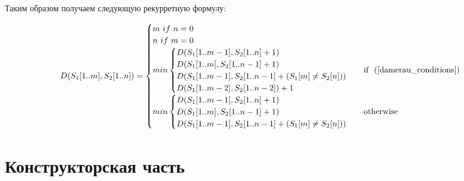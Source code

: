 \documentclass[12pt, a4paper]{report}
\begin{document}
	Таким образом получаем следующую рекурретную формулу:
	
	\begin{equation}
	\label{formula_damerau}
	D(S_{1}[1..m],S_{2}[1..n]) = \begin{cases}
	m\ if\ n = 0\\
	n\ if\ m = 0\\
	min \begin{cases}
		D(S_{1}[1..m-1], S_{2}[1..n] + 1)\\
		D(S_{1}[1..m], S_{2}[1..n-1]+1)\\
		D(S_{1}[1..m-1], S_{2}[1..n-1]+(S_{1}[m] \neq S_{2}[n]))\\
		D(S_{1}[1..m-2], S_{2}[1..n-2])+1
	\end{cases} & \mbox{if ~(\ref{damerau_conditions})}\\	
	min \begin{cases}
		D(S_{1}[1..m-1], S_{2}[1..n] + 1)\\
		D(S_{1}[1..m], S_{2}[1..n-1]+1)\\
		D(S_{1}[1..m-1], S_{2}[1..n-1]+(S_{1}[m] \neq S_{2}[n]))
	\end{cases} & \mbox{otherwise}\\
	\end{cases}
	\end{equation}

	\chapter{Конструкторская часть}
	
\end{document}
